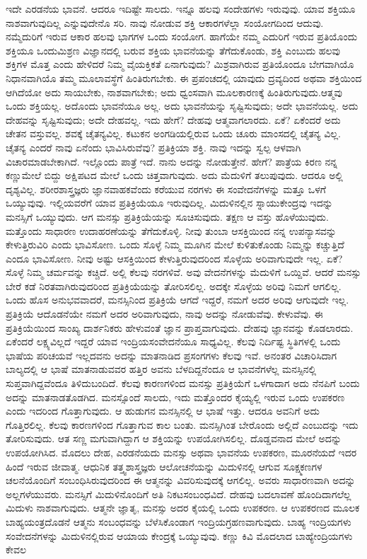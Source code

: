 ಇದೇ ಎರಡನೆಯ ಭಾವನೆ. ಆದರೂ ಇದಿಷ್ಟೇ ಸಾಲದು. ಇನ್ನೂ ಹಲವು ಸಂದೇಹಗಳು ಇರುವುವು. ಯಾವ ಶಕ್ತಿಯೂ ನಾಶವಾಗುವುದಿಲ್ಲ ಎನ್ನುವುದೇನೊ ಸರಿ. ನಾವು ನೋಡುವ ಶಕ್ತಿ ಆಕಾರಗಳೆಲ್ಲಾ ಸಂಯೋಗದಿಂದ ಆದುವು. ನಮ್ಮೆದುರಿಗೆ ಇರುವ ಆಕಾರ ಹಲವು ಭಾಗಗಳ ಒಂದು ಸಂಯೋಗ. ಹಾಗೆಯೇ ನಮ್ಮ ಎದುರಿಗೆ ಇರುವ ಪ್ರತಿಯೊಂದು ಶಕ್ತಿಯೂ ಒಂದುಮಿಶ್ರಣ ವಿಜ್ಞಾನದಲ್ಲಿ ಬರುವ ಶಕ್ತಿಯ ಭಾವನೆಯನ್ನು ತೆಗೆದುಕೊಂಡು, ಶಕ್ತಿ ಎಂಬುದು ಹಲವು ಶಕ್ತಿಗಳ ಮೊತ್ತ ಎಂದು ಹೇಳಿದರೆ ನಿಮ್ಮ ವೈಯಕ್ತಿಕತೆ ಏನಾಗುವುದು? ಮಿಶ್ರವಾಗಿರುವ ಪ್ರತಿಯೊಂದೂ ಬೇಗವಾಗಿಯೊ ನಿಧಾನವಾಗಿಯೊ ತಮ್ಮ ಮೂಲಾವಸ್ಥೆಗೆ ಹಿಂತಿರುಗಬೇಕು. ಈ ಪ್ರಪಂಚದಲ್ಲಿ ಯಾವುದು ದ್ರವ್ಯದಿಂದ ಅಥವಾ ಶಕ್ತಿಯಿಂದ ಆಗಿದೆಯೋ ಅದು ಸಾಯಬೇಕು, ನಾಶವಾಗಬೇಕು; ಅದು ಧ್ವಂಸವಾಗಿ ಮೂಲಕಾರಣಕ್ಕೆ ಹಿಂತಿರುಗುವುದು.ಆತ್ಮವು ಒಂದು ಶಕ್ತಿಯಲ್ಲ. ಅದೊಂದು ಭಾವನೆಯೂ ಅಲ್ಲ. ಅದು ಭಾವನೆಯನ್ನು ಸೃಷ್ಟಿಸುವುದು; ಅದೇ ಭಾವನೆಯಲ್ಲ. ಅದು ದೇಹವನ್ನು ಸೃಷ್ಟಿಸುವುದು; ಅದೇ ದೇಹವಲ್ಲ. ಇದು ಹೇಗೆ? ದೇಹವು ಆತ್ಮವಾಗಲಾರದು. ಏಕೆ? ಏಕೆಂದರೆ ಅದು ಚೇತನ ವಸ್ತುವಲ್ಲ. ಶವಕ್ಕೆ ಚೈತನ್ಯವಿಲ್ಲ. ಕಟುಕನ ಅಂಗಡಿಯಲ್ಲಿರುವ ಒಂದು ಚೂರು ಮಾಂಸದಲ್ಲಿ ಚೈತನ್ಯ ವಿಲ್ಲ. ಚೈತನ್ಯ ಎಂದರೆ ನಾವು ಏನೆಂದು ಭಾವಿಸಿರುವೆವು? ಪ್ರತಿಕ್ರಿಯಾ ಶಕ್ತಿ. ನಾವು ಇದನ್ನು ಸ್ವಲ್ಪ ಆಳವಾಗಿ ವಿಚಾರಮಾಡಬೇಕಾಗಿದೆ. ಇಲ್ಲೊಂದು ಪಾತ್ರೆ ಇದೆ. ನಾನು ಅದನ್ನು ನೋಡುತ್ತೇನೆ. ಹೇಗೆ? ಪಾತ್ರೆಯ ಕಿರಣ ನನ್ನ ಕಣ್ಣುಮೇಲೆ ಬಿದ್ದು ಅಕ್ಷಿಪಟದ ಮೇಲೆ ಒಂದು ಚಿತ್ತವಾಗುವುದು. ಅದು ಮೆದುಳಿಗೆ ತಲುಪುವುದು. ಆದರೂ ಅಲ್ಲಿ ದೃಶ್ಯವಿಲ್ಲ. ಶರೀರಶಾಸ್ತ್ರಜ್ಞರು ಜ್ಞಾನವಾಹಕವೆಂದು ಕರೆಯುವ ನರಗಳು ಈ ಸಂವೇದನೆಗಳನ್ನು ಮತ್ತೂ ಒಳಗೆ ಒಯ್ಯುವುವು. ಇಲ್ಲಿಯವರೆಗೆ ಯಾವ ಪ್ರತಿಕ್ರಿಯೆಯೂ ಇರುವುದಿಲ್ಲ. ಮಿದುಳಿನಲ್ಲಿನ ಸ್ನಾಯುಕೇಂದ್ರವು ಇದನ್ನು ಮನಸ್ಸಿಗೆ ಒಯ್ಯುವುದು. ಆಗ ಮನಸ್ಸು ಪ್ರತಿಕ್ರಿಯೆಯನ್ನು ಸೂಚಿಸುವುದು. ತಕ್ಷಣ ಆ ವಸ್ತು ಹೊಳೆಯುವುದು. ಮತ್ತೊಂದು ಸಾಧಾರಣ ಉದಾಹರಣೆಯನ್ನು ತೆಗೆದುಕೊಳ್ಳಿ. ನೀವು ತುಂಬಾ ಆಸಕ್ತಿಯಿಂದ ನನ್ನ ಉಪನ್ಯಾಸವನ್ನು ಕೇಳುತ್ತಿರುವಿರಿ ಎಂದು ಭಾವಿಸೋಣ. ಒಂದು ಸೊಳ್ಳೆ ನಿಮ್ಮ ಮೂಗಿನ ಮೇಲೆ ಕುಳಿತುಕೊಂಡು ನಿಮ್ಮನ್ನು ಕಚ್ಚುತ್ತಿದೆ ಎಂದೂ ಭಾವಿಸೋಣ. ನೀವು ಅಷ್ಟು ಆಸಕ್ತಿಯಿಂದ ಕೇಳುತ್ತಿರುವುದರಿಂದ ಸೊಳ್ಳೆಯ ಅರಿವಾಗುವುದೇ ಇಲ್ಲ. ಏಕೆ? ಸೊಳ್ಳೆ ನಿಮ್ಮ ಚರ್ಮವನ್ನು ಕಚ್ಚಿದೆ. ಅಲ್ಲಿ ಕೆಲವು ನರಗಳಿವೆ. ಅವು ವೇದನೆಗಳನ್ನು ಮೆದುಳಿಗೆ ಒಯ್ದಿವೆ. ಆದರೆ ಮನಸ್ಸು ಬೇರೆ ಕಡೆ ನಿರತವಾಗಿರುವುದರಿಂದ ಪ್ರತಿಕ್ರಿಯೆಯನ್ನು ತೋರಿಸಲಿಲ್ಲ. ಅದಕ್ಕೇ ಸೊಳ್ಳೆಯ ಅರಿವು ನಿಮಗೆ ಆಗಲಿಲ್ಲ. ಒಂದು ಹೊಸ ಅನುಭವವಾದರೆ, ಮನಸ್ಸಿನಿಂದ ಪ್ರತಿಕ್ರಿಯೆ ಆಗದೆ ಇದ್ದರೆ, ನಮಗೆ ಅದರ ಅರಿವು ಆಗುವುದೇ ಇಲ್ಲ. ಪ್ರತಿಕ್ರಿಯೆ ಆದೊಡನೆಯೇ ನಮಗೆ ಅದರ ಅರಿವಾಗುವುದು, ನಾವು ಅದನ್ನು ನೋಡುವೆವು. ಕೇಳುವೆವು. ಈ ಪ್ರತಿಕ್ರಿಯೆಯಿಂದ ಸಾಂಖ್ಯ ದಾರ್ಶನಿಕರು ಹೇಳುವಂತೆ ಜ್ಞಾನ ಪ್ರಾಪ್ತವಾಗುವುದು. ದೇಹವು ಜ್ಞಾನವನ್ನು ಕೊಡಲಾರದು. ಏಕೆಂದರೆ ಲಕ್ಷ್ಯವಿಲ್ಲದೆ ಇದ್ದರೆ ಯಾವ ಇಂದ್ರಿಯಸಂವೇದನೆಯೂ ಸಾಧ್ಯವಿಲ್ಲ. ಕೆಲವು ನಿರ್ದಿಷ್ಟ ಸ್ಥಿತಿಗಳಲ್ಲಿ ಒಂದು ಭಾಷೆಯ ಪರಿಚಯವೆ ಇಲ್ಲದವನು ಅದನ್ನು ಮಾತನಾಡಿದ ಪ್ರಸಂಗಗಳು ಕೆಲವು ಇವೆ. ಅನಂತರ ವಿಚಾರಿಸಿದಾಗ ಬಾಲ್ಯದಲ್ಲಿ ಆ ಭಾಷೆ ಮಾತನಾಡುವವರ ಹತ್ತಿರ ಅವನು ಬೆಳದಿದ್ದನೆಂದೂ ಆ ಭಾವನೆಗಳೆಲ್ಲ ಮನಸ್ಸಿನಲ್ಲಿ ಸುಪ್ತವಾಗಿದ್ದವೆಂದೂ ತಿಳಿದುಬಂದಿದೆ. ಕೆಲವು ಕಾರಣಗಳಿಂದ ಮನಸ್ಸು ಪ್ರತಿಕ್ರಿಯೆಗೆ ಒಳಗಾದಾಗ ಅದು ನೆನಪಿಗೆ ಬಂದು ಅದನ್ನು ಮಾತನಾಡತೊಡಗಿದ. ಮನಸ್ಸೊಂದೆ ಸಾಲದು, ಇದು ಮತ್ತೊಂದರ ಕೈಯ್ಯಲ್ಲಿ ಇರುವ ಒಂದು ಉಪಕರಣ ಎಂದು ಇದರಿಂದ ಗೊತ್ತಾಗುವುದು. ಆ ಹುಡುಗನ ಮನಸ್ಸಿನಲ್ಲಿ ಆ ಭಾಷೆ ಇತ್ತು. ಆದರೂ ಅವನಿಗೆ ಅದು ಗೊತ್ತಿರಲಿಲ್ಲ. ಕೆಲವು ಕಾರಣಗಳಿಂದ ಗೊತ್ತಾಗುವ ಕಾಲ ಬಂತು. ಮನಸ್ಸಿಗಿಂತ ಬೇರೊಂದು ಅಲ್ಲಿದೆ ಎಂಬುದನ್ನು ಇದು ತೋರಿಸುವುದು. ಆತ ಸಣ್ಣ ಮಗುವಾಗಿದ್ದಾಗ ಆ ಶಕ್ತಿಯನ್ನು ಉಪಯೋಗಿಸಲಿಲ್ಲ. ದೊಡ್ಡವನಾದ ಮೇಲೆ ಅದನ್ನು ಉಪಯೋಗಿಸಿದ. ಮೊದಲು ದೇಹ, ಎರಡನೆಯದು ಮನಸ್ಸು ಅಥವಾ ಭಾವನೆಯ ಉಪಕರಣ, ಮೂರನೆಯದೆ ಇದರ ಹಿಂದೆ ಇರುವ ಜೀವಾತ್ಮ. ಆಧುನಿಕ ತತ್ತ್ವಶಾಸ್ತ್ರಜ್ಞರು ಆಲೋಚನೆಯನ್ನು ಮಿದುಳಿನಲ್ಲಿ ಆಗುವ ಸೂಕ್ಷ್ಮಕಣಗಳ ಚಲನೆಯೊಂದಿಗೆ ಸಂಬಂಧಿಸಿರುವುದರಿಂದ ಈ ಆತ್ಮನನ್ನು ವಿವರಿಸುವುದಕ್ಕೆ ಆಗಲಿಲ್ಲ. ಅವರು ಸಾಧಾರಣವಾಗಿ ಅದನ್ನು ಅಲ್ಲಗಳೆಯುವರು. ಮನಸ್ಸಿಗೆ ಮಿದುಳಿನೊಂದಿಗೆ ಅತಿ ನಿಕಟಸಂಬಂಧವಿದೆ. ದೇಹವು ಬದಲಾವಣೆ ಹೊಂದಿದಾಗಲೆಲ್ಲ ಮಿದುಳು ನಾಶವಾಗುವುದು. ಆತ್ಮನೇ ಜ್ಞಾತೃ, ಮನಸ್ಸು ಅದರ ಕೈಯಲ್ಲಿ ಒಂದು ಉಪಕರಣ. ಆ ಉಪಕರಣದ ಮೂಲಕ ಬಾಹ್ಯಯಂತ್ರದೊಡನೆ ಆತ್ಮನು ಸಂಬಂಧವನ್ನು ಬೆಳೆಸಿಕೊಂಡಾಗ ಇಂದ್ರಿಯಗ್ರಹಣವಾಗುವುದು. ಬಾಹ್ಯ ಇಂದ್ರಿಯಗಳು ಸಂವೇದನೆಗಳನ್ನು ಮಿದುಳಿನಲ್ಲಿರುವ ಆಯಾಯ ಕೇಂದ್ರಕ್ಕೆ ಒಯ್ಯುವುವು. ಕಣ್ಣು ಕಿವಿ ಮೊದಲಾದ ಬಾಹ್ಯೇಂದ್ರಿಯಗಳು ಕೇವಲ 